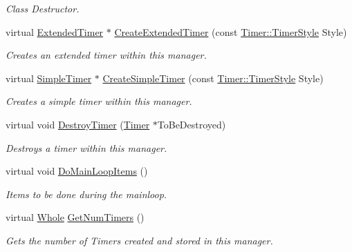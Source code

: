 \begin{DoxyCompactItemize}
\begin{DoxyCompactList}\small\item\em Class Destructor. \item\end{DoxyCompactList}\item 
virtual \hyperlink{classMezzanine_1_1ExtendedTimer}{ExtendedTimer} $\ast$ \hyperlink{classMezzanine_1_1TimerManager_a2f96dc0fdc223b2c78f18f515bca2c34}{CreateExtendedTimer} (const \hyperlink{classMezzanine_1_1Timer_a1db436d4e0d6f1676e41ba3cb2ea3aaa}{Timer::TimerStyle} Style)
\begin{DoxyCompactList}\small\item\em Creates an extended timer within this manager. \item\end{DoxyCompactList}\item 
virtual \hyperlink{classMezzanine_1_1SimpleTimer}{SimpleTimer} $\ast$ \hyperlink{classMezzanine_1_1TimerManager_abe68dba04eac77cb8a2a333aea26bb4c}{CreateSimpleTimer} (const \hyperlink{classMezzanine_1_1Timer_a1db436d4e0d6f1676e41ba3cb2ea3aaa}{Timer::TimerStyle} Style)
\begin{DoxyCompactList}\small\item\em Creates a simple timer within this manager. \item\end{DoxyCompactList}\item 
virtual void \hyperlink{classMezzanine_1_1TimerManager_a7ac6225d3e7fd72d53cf213464bded6e}{DestroyTimer} (\hyperlink{classMezzanine_1_1Timer}{Timer} $\ast$ToBeDestroyed)
\begin{DoxyCompactList}\small\item\em Destroys a timer within this manager. \item\end{DoxyCompactList}\item 
virtual void \hyperlink{classMezzanine_1_1TimerManager_a6ac7544b79fb023e4596e350a5586f85}{DoMainLoopItems} ()
\begin{DoxyCompactList}\small\item\em Items to be done during the mainloop. \item\end{DoxyCompactList}\item 
virtual \hyperlink{namespaceMezzanine_adcbb6ce6d1eb4379d109e51171e2e493}{Whole} \hyperlink{classMezzanine_1_1TimerManager_a683dcef5328ff001adb1f3fc40fd6132}{GetNumTimers} ()
\begin{DoxyCompactList}\small\item\em Gets the number of Timers created and stored in this manager. \item\end{DoxyCompactList}\item 

\end{DoxyCompactItemize}
